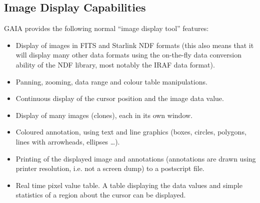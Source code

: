 \documentclass[twoside,11pt]{article}
\newcommand{\xref}[3]{#1}
\newcommand{\xlabel}[1]{}
\renewcommand{\_}{\texttt{\symbol{95}}}
\begin{document}
\subsection{\xlabel{image_display_capabilities}Image Display Capabilities}
GAIA provides the following normal ``image display tool'' features:
\begin{itemize}
\item Display of images in FITS and Starlink \xref{NDF}{sun33}{}
  formats (this also means that it will display many other data formats
  using the on-the-fly data conversion ability of the NDF library, most
  notably the IRAF data format).

\item Panning, zooming, data range and colour table manipulations.

\item Continuous display of the cursor position and the image data
  value.

\item Display of many images (clones), each in its own window.

\item Coloured annotation, using text and line graphics (boxes,
  circles, polygons, lines with arrowheads, ellipses \ldots).

\item Printing of the displayed image and annotations (annotations
  are drawn using printer resolution, i.e. not a screen dump)
  to a postscript file.

\item Real time pixel value table. A table displaying the data
  values and simple statistics of a region about the cursor can be
  displayed.

\end{itemize}
\end{document}
